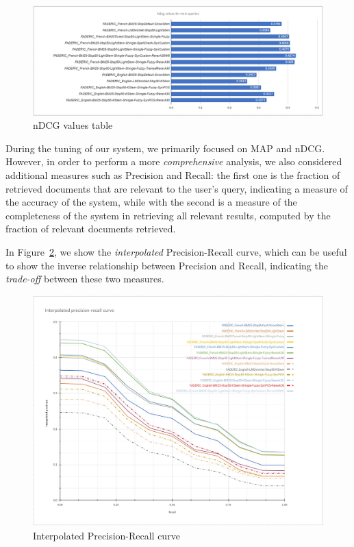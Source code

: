 \begin{figure}[!h]
  \centering
  \includegraphics[width=1\linewidth]{figure/ndcg-values.jpg}
  \caption{\ac{nDCG} values table}
  \label{fig:ndcg-values}
\end{figure}

During the tuning of our system, we primarily focused on \ac{MAP} and \ac{nDCG}. However, in order to perform a more \emph{comprehensive} analysis, 
we also considered additional measures such as Precision and Recall: the first one is the fraction of retrieved 
documents that are relevant to the user's query, indicating a measure of the accuracy of the system,
while with the second is a measure of the completeness of the system in retrieving all relevant results, 
computed by the fraction of relevant documents retrieved.

In Figure~\ref{fig:precision-recall-curve}, we show the \emph{interpolated} Precision-Recall curve, which can be useful to show the inverse relationship between Precision and Recall, indicating the \emph{trade-off} between these two measures.

\begin{figure}[!h]
  \centering
  \includegraphics[width=1\linewidth]{figure/prec-recall.jpg}
  \caption{Interpolated Precision-Recall curve}
  \label{fig:precision-recall-curve}
\end{figure}

